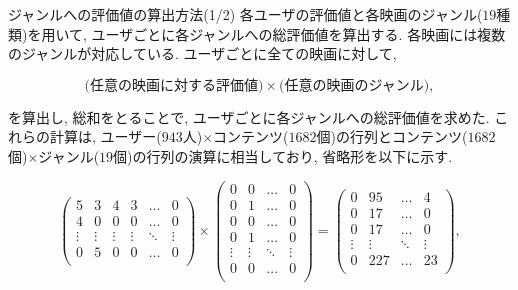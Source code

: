 \documentclass[dvipdfmx]{beamer} %
\begin{document}
\begin{frame}{ジャンルへの評価値の算出方法(1/2)}
各ユーザの評価値と各映画のジャンル($19$種類)を用いて, ユーザごとに各ジャンルへの総評価値を算出する. 各映画には複数のジャンルが対応している. ユーザごとに全ての映画に対して, 

\begin{equation*}
\mbox{(任意の映画に対する評価値)} \times \mbox{(任意の映画のジャンル)},
\end{equation*}

\noindent
を算出し, 総和をとることで, ユーザごとに各ジャンルへの総評価値を求めた. これらの計算は, ユーザー($943$人)$\times$コンテンツ($1682$個)の行列とコンテンツ($1682$個)$\times$ジャンル($19$個)の行列の演算に相当しており, 省略形を以下に示す. 

\footnotesize %
\begin{equation*}
\label{user_genre_matrix}
\begin{pmatrix} 
5 & 3 & 4 & 3 & \ldots & 0 \\
4 & 0 & 0 & 0 & \ldots & 0 \\
\vdots & \vdots & \vdots & \vdots & \ddots & \vdots \\
0 & 5 & 0 & 0 & \ldots & 0 \\
\end{pmatrix} 
\times
\begin{pmatrix} 
0 & 0 & \ldots & 0 \\
0 & 1 & \ldots & 0 \\
0 & 0 & \ldots & 0 \\
0 & 1 & \ldots & 0 \\
\vdots & \vdots & \ddots & \vdots \\
0 & 0 & \ldots & 0 \\
\end{pmatrix}
=
\begin{pmatrix} 
0 & 95 & \ldots & 4 \\
0 & 17 & \ldots & 0 \\
0 & 17 & \ldots & 0 \\
\vdots & \vdots & \ddots & \vdots \\
0 & 227 & \ldots & 23 \\
\end{pmatrix},
\end{equation*}
\normalsize

\end{frame}
\end{document}

